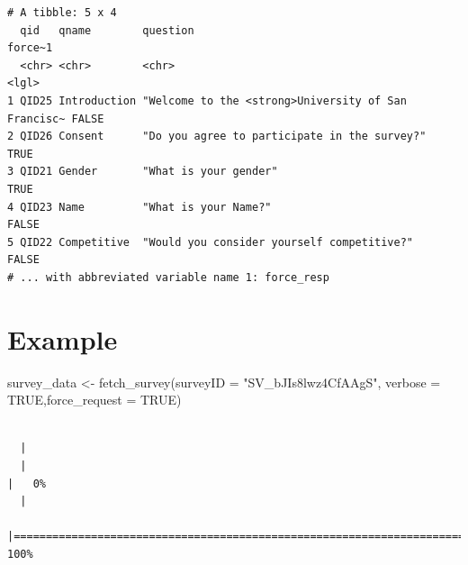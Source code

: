 \documentclass[
  letterpaper,
]{book}
\newenvironment{Shaded}{\begin{snugshade}}{\end{snugshade}}
\newcommand{\AttributeTok}[1]{\textcolor[rgb]{0.40,0.45,0.13}{#1}}
\newcommand{\ConstantTok}[1]{\textcolor[rgb]{0.56,0.35,0.01}{#1}}
\newcommand{\FunctionTok}[1]{\textcolor[rgb]{0.28,0.35,0.67}{#1}}
\newcommand{\NormalTok}[1]{\textcolor[rgb]{0.00,0.23,0.31}{#1}}
\newcommand{\OtherTok}[1]{\textcolor[rgb]{0.00,0.23,0.31}{#1}}
\newcommand{\StringTok}[1]{\textcolor[rgb]{0.13,0.47,0.30}{#1}}
\begin{document}
\begin{verbatim}
# A tibble: 5 x 4
  qid   qname        question                                            force~1
  <chr> <chr>        <chr>                                               <lgl>  
1 QID25 Introduction "Welcome to the <strong>University of San Francisc~ FALSE  
2 QID26 Consent      "Do you agree to participate in the survey?"        TRUE   
3 QID21 Gender       "What is your gender"                               TRUE   
4 QID23 Name         "What is your Name?"                                FALSE  
5 QID22 Competitive  "Would you consider yourself competitive?"          FALSE  
# ... with abbreviated variable name 1: force_resp
\end{verbatim}

\hypertarget{example}{%
\section{Example}\label{example}}

\begin{Shaded}
\begin{Highlighting}[]
\NormalTok{survey\_data }\OtherTok{\textless{}{-}} \FunctionTok{fetch\_survey}\NormalTok{(}\AttributeTok{surveyID =} \StringTok{"SV\_bJIs8lwz4CfAAgS"}\NormalTok{, }
                            \AttributeTok{verbose =} \ConstantTok{TRUE}\NormalTok{,}\AttributeTok{force\_request =} \ConstantTok{TRUE}\NormalTok{)}
\end{Highlighting}
\end{Shaded}

\begin{verbatim}

  |                                                                            
  |                                                                      |   0%
  |                                                                            
  |======================================================================| 100%
\end{verbatim}
\end{document}
